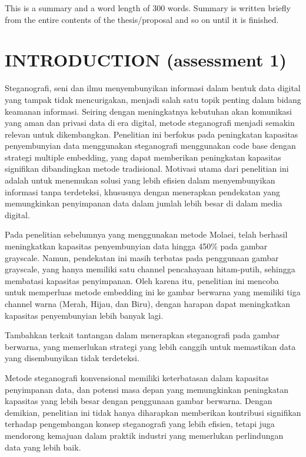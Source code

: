 \documentclass{ittelkom}
\begin{document}

{This is a summary and a word length of 300 words. Summary is written briefly from the entire contents of the thesis/proposal and so on until it is finished.}

\newpage
\section{INTRODUCTION \color{red} (assessment 1)}
Steganografi, seni dan ilmu menyembunyikan \cite{juneja2013improved} informasi dalam bentuk data digital yang tampak tidak mencurigakan, menjadi salah satu topik penting dalam bidang keamanan informasi. Seiring dengan meningkatnya kebutuhan akan komunikasi yang aman dan privasi data di era digital, metode steganografi menjadi semakin relevan untuk dikembangkan. Penelitian ini berfokus pada peningkatan kapasitas penyembunyian data menggunakan steganografi menggunakan code base dengan strategi multiple embedding, yang dapat memberikan peningkatan kapasitas signifikan dibandingkan metode tradisional. Motivasi utama dari penelitian ini adalah untuk menemukan solusi yang lebih efisien dalam menyembunyikan informasi tanpa terdeteksi, khususnya dengan menerapkan pendekatan yang memungkinkan penyimpanan data dalam jumlah lebih besar di dalam media digital.

Pada penelitian sebelumnya yang menggunakan metode Molaei, telah berhasil meningkatkan kapasitas penyembunyian data hingga 450\% pada gambar grayscale. Namun, pendekatan ini masih terbatas pada penggunaan gambar grayscale, yang hanya memiliki satu channel pencahayaan hitam-putih, sehingga membatasi kapasitas penyimpanan. Oleh karena itu, penelitian ini mencoba untuk memperluas metode embedding ini ke gambar berwarna yang memiliki tiga channel warna (Merah, Hijau, dan Biru), dengan harapan dapat meningkatkan kapasitas penyembunyian lebih banyak lagi.

Tambahkan terkait tantangan dalam menerapkan steganografi pada gambar berwarna, yang memerlukan strategi yang lebih canggih untuk memastikan data yang disembunyikan tidak terdeteksi.

Metode steganografi konvensional memiliki keterbatasan dalam kapasitas penyimpanan data, dan potensi masa depan yang memungkinkan peningkatan kapasitas yang lebih besar dengan penggunaan gambar berwarna. Dengan demikian, penelitian ini tidak hanya diharapkan memberikan kontribusi signifikan terhadap pengembangan konsep steganografi yang lebih efisien, tetapi juga mendorong kemajuan dalam praktik industri yang memerlukan perlindungan data yang lebih baik.
\end{document}
